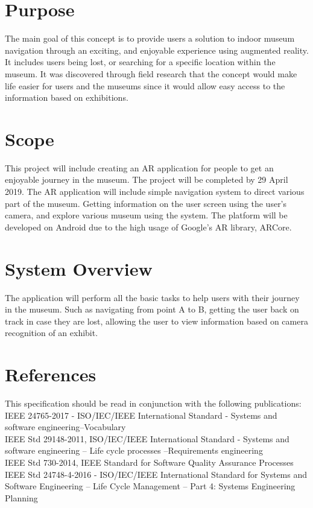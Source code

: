 \section{Purpose}
The main goal of this concept is to provide users a solution to indoor museum navigation through an exciting, and enjoyable experience using augmented reality. It includes users being lost, or searching for a specific location within the museum. It was discovered through field research that the concept would make life easier for users and the museums since it would allow easy access to the information based on exhibitions.

\section{Scope}
This project will include creating an AR application for people to get an enjoyable journey in the museum. The project will be completed by 29 April 2019. The AR application will include simple navigation system to direct various part of the museum. Getting information on the user screen using the user's camera, and explore various museum using the system. The platform will be developed on Android due to the high usage of Google's AR library, ARCore.

\section{System Overview}
The application will perform all the basic tasks to help users with their journey in the museum. Such as navigating from point A to B, getting the user back on track in case they are lost, allowing the user to view information based on camera recognition of an exhibit.

\section{References}
This specification should be read in conjunction with the following publications:\\
IEEE 24765-2017 - ISO/IEC/IEEE International Standard - Systems and software engineering--Vocabulary \cite{IEEE24765}\\
IEEE Std 29148-2011, ISO/IEC/IEEE International Standard - Systems and software engineering -- Life cycle processes --Requirements engineering \cite{IEEE29148} \\
IEEE Std 730-2014, IEEE Standard for Software Quality Assurance Processes \cite{IEEE730} \\
IEEE Std 24748-4-2016 - ISO/IEC/IEEE International Standard for Systems and Software Engineering -- Life Cycle Management -- Part 4: Systems Engineering Planning \cite{IEEE24748}

